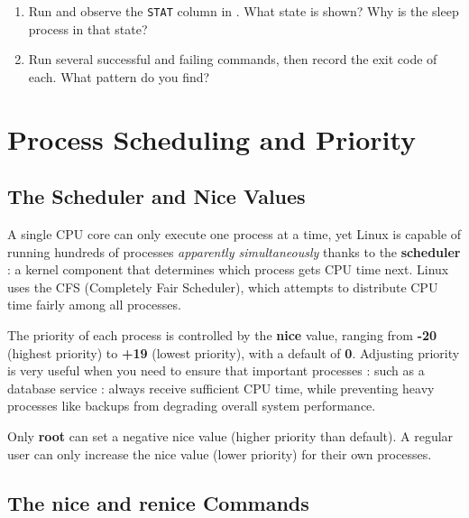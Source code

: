 \begin{exercisebox}[5.2]
  \begin{enumerate}
    \item Run  and observe the \texttt{STAT} column in
      . What state is shown? Why is the sleep process in that
      state?
    \item Run several successful and failing commands, then record the exit
      code of each. What pattern do you find?
  \end{enumerate}
\end{exercisebox}

\section{Process Scheduling and Priority}
\label{sec:process-scheduling}

\subsection{The Scheduler and Nice Values}

A single CPU core can only execute one process at a time, yet Linux is capable
of running hundreds of processes \textit{apparently simultaneously} thanks to
the \textbf{scheduler} : a kernel component that determines which process gets
CPU time next. Linux uses the CFS (Completely Fair Scheduler), which attempts
to distribute CPU time fairly among all processes.

The priority of each process is controlled by the \textbf{nice} value, ranging
from \textbf{-20} (highest priority) to \textbf{+19} (lowest priority), with a
default of \textbf{0}. Adjusting priority is very useful when you need to ensure
that important processes : such as a database service : always receive sufficient
CPU time, while preventing heavy processes like backups from degrading overall
system performance.

\begin{notebox}
  Only \textbf{root} can set a negative nice value (higher priority than
  default). A regular user can only increase the nice value (lower priority)
  for their own processes.
\end{notebox}

\subsection{The nice and renice Commands}

